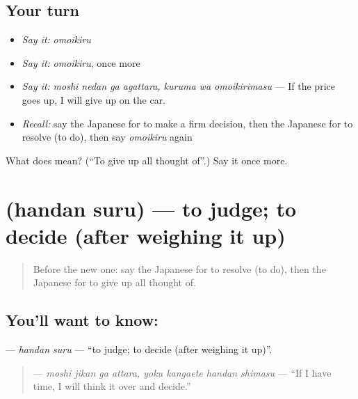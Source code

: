 \subsection*{Your turn}
\begin{itemize}
\raggedright
  \item \emph{Say it:} \emph{omoikiru}
  \item \emph{Say it:} \emph{omoikiru}, once more
  \item \emph{Say it:} \emph{moshi nedan ga agattara, kuruma wa omoikirimasu} — If the price goes up, I will give up on the car.
  \item \emph{Recall:} say the Japanese for to make a firm decision, then the Japanese for to resolve (to do), then say \emph{omoikiru} again
\end{itemize}

\begin{tcolorbox}[breakable,colback=teal!4,colframe=teal!35!black,title={Before you move on}]
What does  mean? (\textquotedblleft{}To give up all thought of\textquotedblright{}.) Say it once more.
\end{tcolorbox}
\section[\texorpdfstring{\ja{はんだんする} (handan suru)}{はんだんする (handan suru)}]{ (handan suru) — to judge; to decide (after weighing it up)}

\label{lesson:JA-C517-handan-suru}



\begin{quote}
Before the new one: say the Japanese for to resolve (to do), then the Japanese for to give up all thought of.
\end{quote}

\subsection*{You'll want to know: }
\textbf{} — \emph{handan suru} — \textquotedblleft{}to judge; to decide (after weighing it up)\textquotedblright{}.

\begin{quote}
\textbf{    } — \emph{moshi jikan ga attara, yoku kangaete handan shimasu} — \textquotedblleft{}If I have time, I will think it over and decide.\textquotedblright{}
\end{quote}

